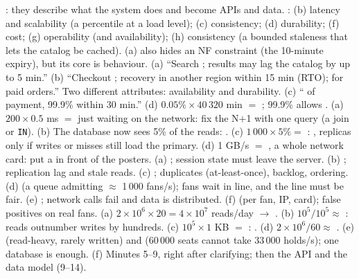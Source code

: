  : they describe what the system does and become APIs and data. : (b) latency and scalability (a percentile at a load level); (c) consistency; (d) durability; (f) cost; (g) operability (and availability); (h) consistency (a bounded staleness that lets the catalog be cached). (a) also hides an NF constraint (the 10-minute expiry), but its core is behaviour.
 (a) ``Search ; results may lag the catalog by up to 5 min.'' (b) ``Checkout ; recovery in another region within 15 min (RTO);  for paid orders.'' Two different attributes: availability and durability. (c) `` of payment, 99.9\% within 30 min.'' (d) $0.05\% \times 40\,320$ min $=$ ; 99.9\% allows .
 (a) $200 \times 0.5$ ms $=$  just waiting on the network: fix the N$+$1 with one query (a join or \texttt{IN}). (b) The database now sees 5\% of the reads: . (c) $1\,000 \times 5\% =$ : , replicas only if writes or misses still load the primary. (d) 1 GB/s $=$ , a whole network card: put a  in front of the posters.
 (a) ; session state must leave the server. (b) ; replication lag and stale reads. (c) ; duplicates (at-least-once), backlog, ordering. (d)  (a queue admitting $\approx$ 1\,000 fans/s); fans wait in line, and the line must be fair. (e) ; network calls fail and data is distributed. (f)  (per fan, IP, card); false positives on real fans.
 (a) $2 \times 10^6 \times 20 = 4 \times 10^7$ reads/day $\to$ . (b) $10^5 / 10^5 \approx$ : reads outnumber writes by hundreds. (c) $10^5 \times 1$ KB $=$ : . (d) $2 \times 10^6 / 60 \approx$ . (e)  (read-heavy, rarely written) and  (60\,000 seats cannot take 33\,000 holds/s); one database is enough. (f) Minutes 5--9, right after clarifying; then the API and the data model (9--14).
